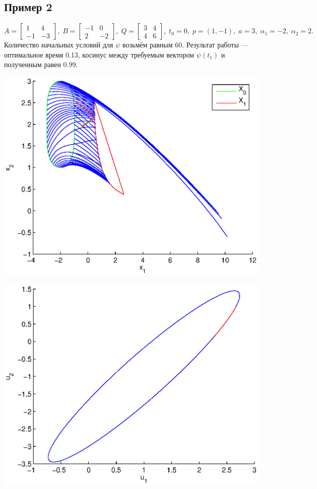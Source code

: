 \documentclass[11pt]{article}
\begin{document}
\subsection{Пример 2}
$$
A = \left[
\begin{matrix}
1 & 4 \\
-1 & -3
\end{matrix}
\right], \;
B = \left[
\begin{matrix}
-1 & 0 \\
2 & -2
\end{matrix}
\right], \;
Q = \left[
\begin{matrix}
3 & 4 \\
4 & 6
\end{matrix}
\right], \;
t_0 = 0, \; p = \left( 1, -1 \right), \; a = 3, \; \alpha_1 = -2, \; \alpha_2 = 2.
$$
Количество начальных условий для $\psi$ возьмём равным 60. Результат работы --- оптимальное время 0.13, косинус между требуемым вектором $\psi(t_1)$ и полученным равен 0.99.

\includegraphics[scale=0.9]{pics/pic2_x.eps}

\includegraphics[scale=0.9]{pics/pic2_u.eps}
\end{document}
